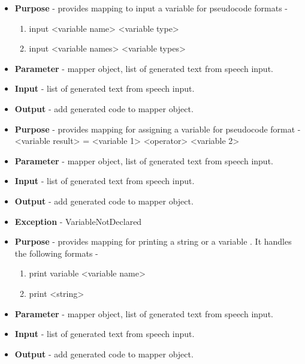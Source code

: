 \documentclass[12pt]{article}
\newcounter{subsubsubsection}[subsubsection]
\begin{document}
\begin{itemize}
    \setlength{\itemsep}{1pt}
    \item \textbf{Purpose} - provides mapping to input a variable for pseudocode formats -
    \begin{enumerate}
        \item input <variable name> <variable type>
        \item input <variable names> <variable types>
    \end{enumerate}
    \item \textbf{Parameter} - mapper object, list of generated text from speech input.
    \item \textbf{Input} - list of generated text from speech input.
    \item \textbf{Output} - add generated code to mapper object.
\end{itemize}

\begin{itemize}
    \setlength{\itemsep}{1pt}
    \item \textbf{Purpose} - provides mapping for assigning a variable for pseudocode format - <variable result> = <variable 1> <operator> <variable 2>
    \item \textbf{Parameter} -  mapper object, list of generated text from speech input.
    \item \textbf{Input} - list of generated text from speech input.
    \item \textbf{Output} - add generated code to mapper object.
    \item \textbf{Exception} - VariableNotDeclared
\end{itemize}

\begin{itemize}
    \setlength{\itemsep}{1pt}
    \item \textbf{Purpose} - provides mapping for printing a string or a variable . It handles the following formats - 	
    \begin{enumerate}
        \item print variable <variable name>
        \item print <string>
    \end{enumerate}
    \item \textbf{Parameter} - mapper object, list of generated text from speech input.
    \item \textbf{Input} -  list of generated text from speech input.
    \item \textbf{Output} - add generated code to mapper object.
\end{itemize}
\end{document}
